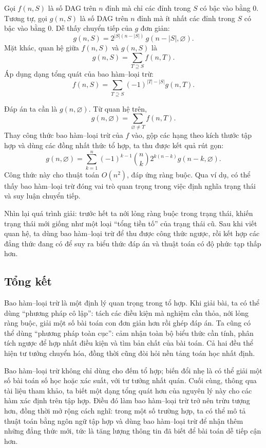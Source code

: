 \documentclass[11pt]{article}
\begin{document}
Gọi \(f(n,S)\) là số DAG trên \(n\) đỉnh mà chỉ các đỉnh trong \(S\) có bậc
vào bằng \(0\). Tương tự, gọi \(g(n,S)\) là số DAG trên \(n\) đỉnh mà ít nhất
các đỉnh trong \(S\) có bậc vào bằng \(0\). Dễ thấy chuyển tiếp của \(g\) đơn
giản:
\[
  g(n,S)=2^{|S|(n-|S|)}\,g(n-|S|,\varnothing).
\]
Mặt khác, quan hệ giữa \(f(n,S)\) và \(g(n,S)\) là
\[
  g(n,S)=\sum_{T\supseteq S} f(n,T).
\]
Áp dụng dạng tổng quát của bao hàm--loại trừ:
\[
  f(n,S)=\sum_{T\supseteq S}(-1)^{|T|-|S|}g(n,T).
\]

Đáp án ta cần là \(g(n,\varnothing)\). Từ quan hệ trên,
\[
  g(n,\varnothing)=\sum_{\varnothing\ne T} f(n,T).
\]
Thay công thức bao hàm--loại trừ của \(f\) vào, gộp các hạng theo kích thước
tập hợp và dùng các đồng nhất thức tổ hợp, ta thu được kết quả rút gọn:
\[
  g(n,\varnothing)=
  \sum_{k=1}^n (-1)^{k-1}\binom nk 2^{k(n-k)}g(n-k,\varnothing).
\]
Công thức này cho thuật toán \(O(n^2)\), đáp ứng ràng buộc. Qua ví dụ, có thể
thấy bao hàm--loại trừ đóng vai trò quan trọng trong việc định nghĩa trạng
thái và suy luận chuyển tiếp.

Nhìn lại quá trình giải: trước hết ta nới lỏng ràng buộc trong trạng thái,
khiến trạng thái mới giống như một loại ``tổng tiền tố'' của trạng thái cũ.
Sau khi viết quan hệ, ta dùng bao hàm--loại trừ để thu được công thức ngược,
rồi kết hợp các đẳng thức đang có để suy ra biểu thức đáp án và thuật toán có
độ phức tạp thấp hơn.

\subsection{Tổng kết}

Bao hàm--loại trừ là một định lý quan trọng trong tổ hợp. Khi giải bài, ta có
thể dùng ``phương pháp cô lập'': tách các điều kiện mà nghiệm cần thỏa, nới
lỏng ràng buộc, giải một số bài toán con đơn giản hơn rồi ghép đáp án. Ta cũng
có thể dùng ``phương pháp toàn cục'': cảm nhận toàn bộ biểu thức cần tính,
phân tích ngược để hợp nhất điều kiện và tìm bản chất của bài toán. Cả hai đều
thể hiện tư tưởng chuyển hóa, đồng thời cũng đòi hỏi nền tảng toán học nhất
định.

Bao hàm--loại trừ không chỉ dùng cho đếm tổ hợp; biến đổi nhẹ là có thể giải
một số bài toán số học hoặc xác suất, với tư tưởng nhất quán. Cuối cùng, thông
qua tài liệu tham khảo, ta biết một dạng tổng quát hơn của nguyên lý này cho
các hàm xác định trên tập hợp. Điều đó làm bao hàm--loại trừ trở nên trừu
tượng hơn, đồng thời mở rộng cách nghĩ: trong một số trường hợp, ta có thể mô
tả thuật toán bằng ngôn ngữ tập hợp và dùng bao hàm--loại trừ để nhận thêm
những đẳng thức mới, tức là tăng lượng thông tin đã biết để bài toán dễ tiếp
cận hơn.
\end{document}
